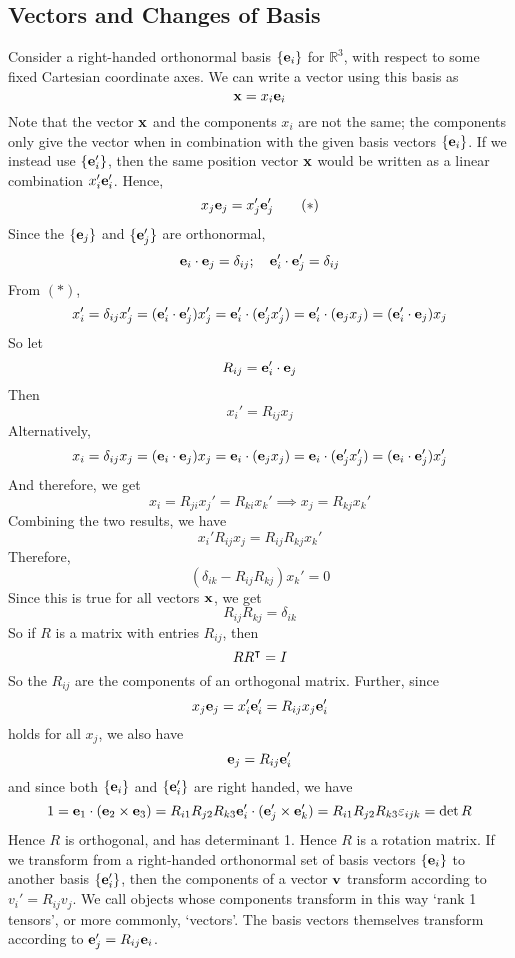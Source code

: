 \documentclass{article}
\begin{document}
\subsection{Vectors and Changes of Basis}
Consider a right-handed orthonormal basis $\{ \vb e_i \}$ for $\mathbb R^3$, with respect to some fixed Cartesian coordinate axes. We can write a vector using this basis as
\[ \vb x = x_i \vb e_i \]
Note that the vector $\vb x$ and the components $x_i$ are not the same; the components only give the vector when in combination with the given basis vectors $\{ \vb e_i \}$. If we instead use $\{ \vb e'_i \}$, then the same position vector $\vb x$ would be written as a linear combination $x'_i \vb e'_i$. Hence,
\begin{equation}
	x_j \vb e_j = x'_j \vb e'_j
	\tag{$\ast$}
\end{equation}
Since the $\{ \vb e_j \}$ and $\{ \vb e'_j \}$ are orthonormal,
\[ \vb e_i \cdot \vb e_j = \delta_{ij};\quad \vb e'_i \cdot \vb e'_j = \delta_{ij} \]
From $(\ast)$,
\[ x_i' = \delta_{ij} x_j' = (\vb e_i' \cdot \vb e_j') x_j' = \vb e_i' \cdot (\vb e_j' x_j') = \vb e_i' \cdot (\vb e_j x_j) = (\vb e_i' \cdot \vb e_j) x_j \]
So let
\[ R_{ij} = \vb e_i' \cdot \vb e_j \]
Then
\[ x_i' = R_{ij} x_j \]
Alternatively,
\[ x_i = \delta_{ij} x_j = (\vb e_i \cdot \vb e_j) x_j = \vb e_i \cdot (\vb e_j x_j) = \vb e_i \cdot (\vb e_j' x_j') = (\vb e_i \cdot \vb e_j') x_j' \]
And therefore, we get
\[ x_i = R_{ji} x_j' = R_{ki} x_k' \implies x_j = R_{kj} x_k' \]
Combining the two results, we have
\[ x_i' R_{ij} x_j = R_{ij} R_{kj} x_k' \]
Therefore,
\[ (\delta_{ik} - R_{ij}R_{kj}) x_k' = 0 \]
Since this is true for all vectors $\vb x$, we get
\[ R_{ij}R_{kj} = \delta_{ik} \]
So if $R$ is a matrix with entries $R_{ij}$, then
\[ R R^\intercal = I \]
So the $R_{ij}$ are the components of an orthogonal matrix. Further, since
\[ x_j \vb e_j = x_i' \vb e_i' = R_{ij} x_j \vb e_i' \]
holds for all $x_j$, we also have
\[ \vb e_j = R_{ij} \vb e_i' \]
and since both $\{ \vb e_i \}$ and $\{ \vb e_i' \}$ are right handed, we have
\[ 1 = \vb e_1 \cdot (\vb e_2 \times \vb e_3) = R_{i1} R_{j2} R_{k3} \vb e_i' \cdot (\vb e_j' \times \vb e_k') = R_{i1} R_{j2} R_{k3} \varepsilon_{ijk} = \det R \]
Hence $R$ is orthogonal, and has determinant 1. Hence $R$ is a rotation matrix. If we transform from a right-handed orthonormal set of basis vectors $\{ \vb e_i \}$ to another basis $\{ \vb e_i' \}$, then the components of a vector $\vb v$ transform according to $v_i' = R_{ij} v_j$. We call objects whose components transform in this way `rank 1 tensors', or more commonly, `vectors'. The basis vectors themselves transform according to $\vb e_j' = R_{ij} \vb e_i$.
\end{document}
